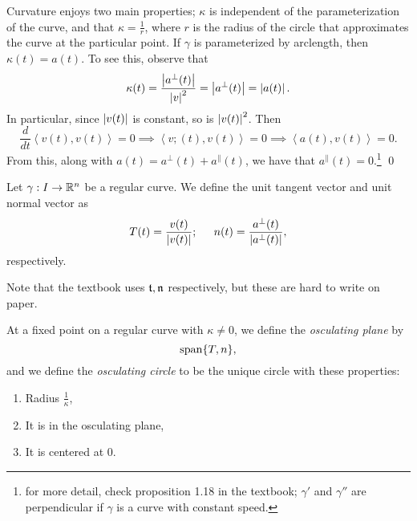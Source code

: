 Curvature enjoys two main properties; $\kappa$ is independent of the parameterization of the curve, and that $\kappa = \frac{1}{r}$, where $r$ is the radius of the circle that approximates the curve at the particular point. If $\gamma$ is parameterized by arclength, then $\kappa(t) = a(t)$. To see this, observe that
\[ \kappa(t) = \frac{\left\lvert a^\perp(t) \right\rvert}{\left\lvert v \right\rvert^2} = \left\lvert a^\perp(t) \right\rvert = \left\lvert a(t) \right\rvert. \]
In particular, since $\left\lvert v(t) \right\rvert$ is constant, so is $\left\lvert v(t) \right\rvert^2$. Then
\[ \frac{d}{dt} \left< v(t), v(t) \right> = 0 \implies \left< v;(t), v(t) \right> = 0 \implies \left< a(t), v(t) \right> = 0. \]
From this, along with $a(t) = a^\perp(t) + a^\parallel(t)$, we have that $a^\parallel(t) = 0$.\footnote{for more detail, check proposition 1.18 in the textbook; $\gamma'$ and $\gamma''$ are perpendicular if $\gamma$ is a curve with constant speed.} \qed
\begin{definition}
    Let $\gamma : I \to \mathbb R^n$ be a regular curve. We define the unit tangent vector and unit normal vector as
    \[ T(t) = \frac{v(t)}{\left\lvert v(t) \right\rvert}; \hspace{0.2in} n(t) = \frac{a^\perp(t)}{\left\lvert a^\perp(t) \right\rvert}, \]
    respectively.
\end{definition}
\noindent Note that the textbook uses $\mathfrak t, \mathfrak n$ respectively, but these are hard to write on paper.
\begin{definition}
    At a fixed point on a regular curve with $\kappa \neq 0$, we define the \textit{osculating plane} by
    \[ \operatorname{span}\{T, n\}, \]
    and we define the \textit{osculating circle} to be the unique circle with these properties:
    \begin{enumerate}[label=(\alph*)]
        \item Radius $\frac{1}{\kappa}$,
        \item It is in the osculating plane,
        \item It is centered at $0$.
    \end{enumerate}
\end{definition}